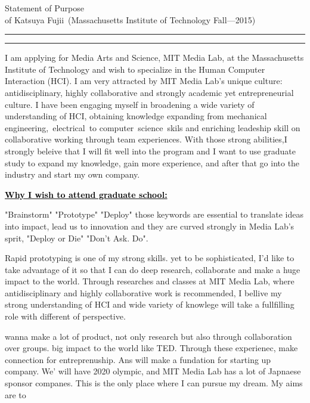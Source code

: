 \documentclass{article}
\newcommand{\soptitle}{Statement of Purpose}
\newcommand{\yourname}{Katsuya Fujii}
\newcommand{\statement}[1]{\par\medskip
  \underline{\textcolor{black}{\textbf{#1:}}}\space
}
\begin{document}
\begin{center}\LARGE\soptitle\\
\large of \yourname\ (Massachusetts Institute of Technology Fall---2015)
\end{center}

\hrule
\vspace{1pt}
\hrule height 1pt

\bigskip


I am applying for Media Arts and Science, MIT Media Lab, at the Massachusetts Institute of Technology and wish to specialize in the Human Computer Interaction (HCI). I am very attracted by MIT Media Lab's unique culture: antidisciplinary, highly collaborative and strongly academic yet entrepreneurial culture. I have been engaging myself in broadening a wide variety of understanding of HCI, obtaining knowledge expanding from mechanical 
engineering, electrical to computer science skils and enriching leadeship skill on collaborative working through team experiences. With those strong abilities,I strongly beleive that I will fit well into the program and I want to use graduate study to expand my knowledge, gain more experience, and after that go into the industry and start my own company.


\statement{Why I wish to attend graduate school} 
"Brainstorm" "Prototype" "Deploy" those keywords are essential to translate ideas into impact, lead us to innovation and they are curved strongly in Media Lab's sprit, "Deploy or Die"  "Don't Ask. Do".

Rapid prototyping is one of my strong skills. yet to be sophisticated, I'd like to take advantage of it so that I can do deep research, collaborate and make a huge impact to the world. Through researches and classes at MIT Media Lab, where antidisciplinary and highly collaborative work is recommended, I bellive my strong understanding of HCI and wide variety of knowlege will take a fullfilling role with different of perspective. 

wanna make a lot of product, not only research but also through collaboration over groups. big impact to the world like TED. Through these experienec, make connection for entreprenuship. Ans will make a fundation for starting up company. We' will have 2020 olympic, and MIT Media Lab has a lot of Japnaese sponsor companes. This is the only place where I can pursue my dream.
My aims are to
\end{document}
